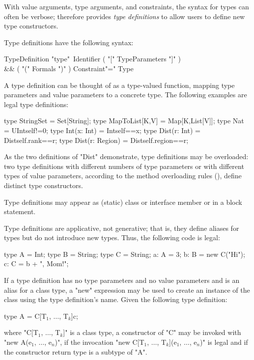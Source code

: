 With value arguments, type arguments, and constraints, the
syntax for \Xten{} types can often be verbose;
\Xten{} therefore provides {\em type definitions}
to allow users to define new type constructors.

Type definitions have the following syntax:

\begin{grammar}
TypeDefinition \: 
                \xcd"type"~Identifier
                           ( \xcd"[" TypeParameters \xcd"]" )\opt \\
                        && ( \xcd"(" Formals \xcd")" )\opt
                            Constraint\opt \xcd"=" Type \\
\end{grammar}

\noindent
A type definition can be thought of as a type-valued function,
mapping type parameters and value parameters to a concrete type.
%
The following examples are legal type definitions:
\begin{xten}
type StringSet = Set[String];
type MapToList[K,V] = Map[K,List[V]];
type Nat = UInt{self!=0};
type Int(x: Int) = Int{self==x};
type Dist(r: Int) = Dist{self.rank==r};
type Dist(r: Region) = Dist{self.region==r};
\end{xten}
\label{TypeDefGuard}
As the two definitions of \xcd"Dist" demonstrate, type definitions may 
be overloaded: two type definitions with different numbers of type
parameters or with different types of value
parameters, according to the method overloading rules
(), define distinct type constructors.

Type definitions may appear as (static) class or interface member or
in a block statement.

Type definitions are applicative, not generative; that is, they
define aliases for types but do not introduce new types.
Thus, the following code is legal:
\begin{xten}
type A = Int;
type B = String;
type C = String;
a: A = 3;
b: B = new C("Hi");
c: C = b + ", Mom!";
\end{xten}
If a type definition has no type parameters and no value
parameters and is an alias for a class type, a \xcd"new"
expression may be used to create an instance of the class using
the type definition's name.
Given the following type definition:
\begin{xtenmath}
type A = C[T$_1$, $\dots$, T$_k$]{c};
\end{xtenmath}
where 
\xcdmath"C[T$_1$, $\dots$, T$_k$]" is a
class type, a constructor of \xcdmath"C" may be invoked with
\xcdmath"new A(e$_1$, $\dots$, e$_n$)", if the
invocation
\xcdmath"new C[T$_1$, $\dots$, T$_k$](e$_1$, $\dots$, e$_n$)" is
legal and if the constructor return type is a subtype of
\xcd"A".

